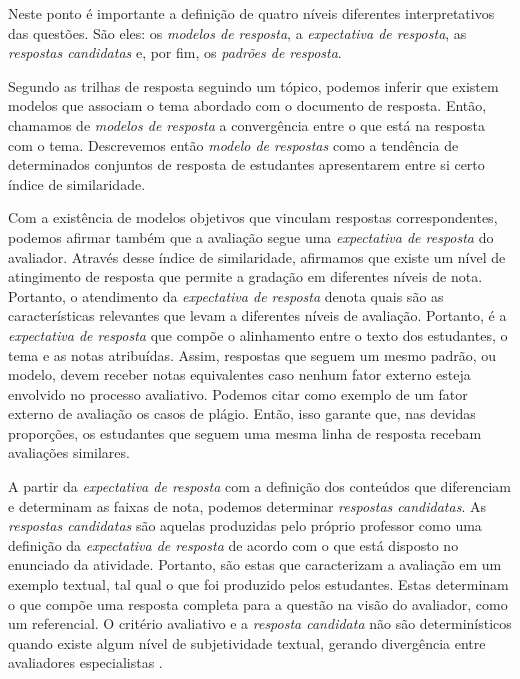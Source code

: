 Neste ponto é importante a definição de quatro níveis diferentes interpretativos das questões. São eles: os \textit{modelos de resposta}, a \textit{expectativa de resposta}, as \textit{respostas candidatas} e, por fim, os \textit{padrões de resposta}. 

Segundo as trilhas de resposta seguindo um tópico, podemos inferir que existem modelos que associam o tema abordado com o documento de resposta. Então, chamamos de \textit{modelos de resposta} a convergência entre o que está na resposta com o tema. Descrevemos então \textit{modelo de respostas} como a tendência de determinados conjuntos de resposta de estudantes apresentarem entre si certo índice de similaridade.

Com a existência de modelos objetivos que vinculam respostas correspondentes, podemos afirmar também que a avaliação segue uma \textit{expectativa de resposta} do avaliador. Através desse índice de similaridade, afirmamos que existe um nível de atingimento de resposta que permite a gradação em diferentes níveis de nota. Portanto, o atendimento da \textit{expectativa de resposta} denota quais são as características relevantes que levam a diferentes níveis de avaliação. Portanto, é a \textit{expectativa de resposta} que compõe o alinhamento entre o texto dos estudantes, o tema e as notas atribuídas. Assim, respostas que seguem um mesmo padrão, ou modelo, devem receber notas equivalentes caso nenhum fator externo esteja envolvido no processo avaliativo. Podemos citar como exemplo de um fator externo de avaliação os casos de plágio. Então, isso garante que, nas devidas proporções, os estudantes que seguem uma mesma linha de resposta recebam avaliações similares.

A partir da \textit{expectativa de resposta} com a definição dos conteúdos que diferenciam e determinam as faixas de nota, podemos determinar \textit{respostas candidatas}. As \textit{respostas candidatas} são aquelas produzidas pelo próprio professor como uma definição da \textit{expectativa de resposta} de acordo com o que está disposto no enunciado da atividade. Portanto, são estas que caracterizam a avaliação em um exemplo textual, tal qual o que foi produzido pelos estudantes. Estas determinam o que compõe uma resposta completa para a questão na visão do avaliador, como um referencial. O critério avaliativo e a \textit{resposta candidata} não são determinísticos quando existe algum nível de subjetividade textual, gerando divergência entre avaliadores especialistas \cite{pado2021}.

